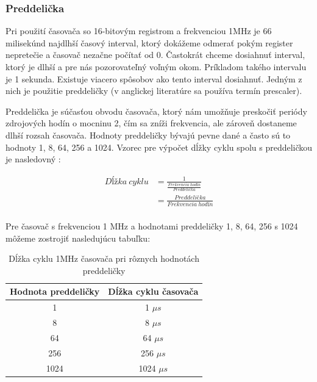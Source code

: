 \subsubsection{Preddelička}
\noindent \par
Pri použití časovača so 16-bitovým registrom a frekvenciou 1MHz je 66 milisekúnd najdlhší časový interval, ktorý dokážeme odmerať pokým register nepretečie a časovač nezačne počítať od 0.
Častokrát chceme dosiahnuť interval, ktorý je dlhší a pre nás pozorovateľný voľným okom. Príkladom takého intervalu je 1 sekunda.
Existuje viacero spôsobov ako tento interval dosiahnuť. Jedným z nich je použitie preddeličky (v anglickej literatúre sa používa termín prescaler).
\par
Preddelička je súčasťou obvodu časovača, ktorý nám umožňuje preskočiť periódy zdrojových hodín o mocninu 2, čím sa zníži frekvencia,
ale zároveň dostaneme dlhší rozsah časovača.
Hodnoty preddeličky bývajú pevne dané a často sú to hodnoty 1, 8, 64, 256 a 1024. Vzorec pre výpočet dĺžky cyklu spolu s preddeličkou je nasledovný \cite{atmelATmega64012801281}:

\begin{equation} \label{eq:cycle-length}
    \begin{aligned}
        Dĺžka\:cyklu & = \frac{1}{\frac{Frekvencia\:hodín}{Preddelička}} \\
                     & = \frac{Preddelička}{Frekvencia\:hodín}           \\
    \end{aligned}
\end{equation}

Pre časovač s frekvenciou 1 \acrshort{MHz} a hodnotami preddeličky 1, 8, 64, 256 s 1024 môžeme zostrojiť nasledujúcu tabuľku:
\begin{table}[!htbp]
    \begin{center}
        \begin{tabular}{|c|c|}
            \hline
            Hodnota preddeličky & Dĺžka cyklu časovača \\
            \hline
            1                   & 1 $\mu s$            \\
            8                   & 8 $\mu s$            \\
            64                  & 64 $\mu s$           \\
            256                 & 256 $\mu s$          \\
            1024                & 1024 $\mu s$         \\
            \hline
        \end{tabular}
        \caption{Dĺžka cyklu 1MHz časovača pri rôznych hodnotách preddeličky}
        \label{table:timerPrescaler}
    \end{center}
\end{table}

